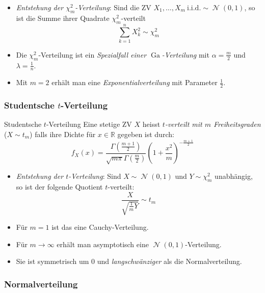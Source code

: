 \documentclass[a4paper,10pt]{article}
\def\R{\mathbb{R}}
\DeclareMathOperator{\normal}{\mathcal{N}}
\numberwithin{equation}{section}
\begin{document}
\begin{itemize}
    \item \emph{Entstehung der \( \chi^2_m \)-Verteilung}: Sind die ZV \( X_1, \dots, X_m \ \text{i.i.d.} \sim \normal(0, 1) \), so ist die Summe ihrer Quadrate \( \chi^2_m \)-verteilt
    \[
        \sum_{k = 1}^n X_k^2 \sim \chi^2_m
    \]
    \item Die \( \chi^2_m \)-Verteilung ist ein \emph{Spezialfall einer \( \mathop{Ga} \)-Verteilung} mit \( \alpha = \frac{m}{2} \) und \( \lambda = \frac{1}{n} \).
    \item Mit \( m = 2 \) erhält man eine \emph{Exponentialverteilung} mit Parameter \( \frac{1}{2} \).
\end{itemize}

\subsubsection{Studentsche \( t \)-Verteilung}

\begin{mainbox}{Studentsche \( t \)-Verteilung}
    Eine stetige ZV \( X \) heisst \emph{\( t \)-verteilt mit \( m \) Freiheitsgraden} (\( X \sim t_m \)) falls ihre Dichte für \( x \in \R \) gegeben ist durch:
    \[
        f_X(x) = \frac{\Gamma\left(\frac{m + 1}{2}\right)}{\sqrt{m \pi} \Gamma\left(\frac{m}{2}\right)} \left(1 + \frac{x^2}{m}\right)^{-\frac{m + 1}{2}}
    \]
\end{mainbox}

\begin{itemize}
    \item \emph{Entstehung der \( t \)-Verteilung}: Sind \( X \sim \normal(0, 1) \) und \( Y \sim \chi^2_m \) unabhängig, so ist der folgende Quotient \( t \)-verteilt:
    \[
        \frac{X}{\sqrt{\frac{1}{m} Y}} \sim t_m
    \]
    \item Für \( m = 1 \) ist das eine Cauchy-Verteilung.
    \item Für \( m \to \infty \) erhält man asymptotisch eine \( \normal(0, 1) \)-Verteilung.
    \item Sie ist symmetrisch um \( 0 \) und \emph{langschwänziger} als die Normalverteilung.
\end{itemize}

\subsubsection{Normalverteilung}
\end{document}
